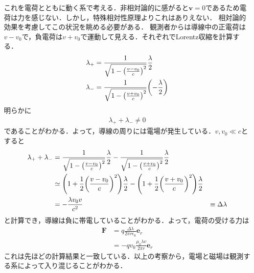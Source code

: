 \documentclass{report}
\begin{document}
  これを電荷とともに動く系で考える．非相対論的に感がると$\bm{v}=0$であるため電荷は力を感じない．しかし，特殊相対性原理よりこれはありえない．
  相対論的効果を考慮してこの状況を眺める必要がある．
  観測者からは導線中の正電荷は$v-v_0$で，負電荷は$v+v_0$で運動して見える．それぞれでLorentz収縮を計算する．
  \begin{align}
    \lambda_{+} &= \frac{1}{\sqrt{1-\qty(\frac{v-v_0}{c})^2}}\frac{\lambda}{2}\\
    \lambda_{-} &= \frac{1}{\sqrt{1-\qty(\frac{v+v_0}{c})^2}}\qty(-\frac{\lambda}{2})
  \end{align}
  明らかに
  \begin{align}
    \lambda_{+} + \lambda_{-} \neq 0
  \end{align}
  であることがわかる．よって，導線の周りには電場が発生している．$v,v_0 \ll c$とすると
  \begin{align}
    \lambda_{+} + \lambda_{-} &= \frac{1}{\sqrt{1-\qty(\frac{v-v_0}{c})^2}}\frac{\lambda}{2} - \frac{1}{\sqrt{1-\qty(\frac{v+v_0}{c})^2}}\frac{\lambda}{2}\\
    &\simeq \qty(1 + \frac{1}{2}\qty(\frac{v-v_0}{c})^2)\frac{\lambda}{2} - \qty(1 + \frac{1}{2}\qty(\frac{v+v_0}{c})^2)\frac{\lambda}{2}\\
    &= - \frac{\lambda v_0 v}{c^2}
    &\equiv \Delta \lambda
  \end{align}
  と計算でき，導線は負に帯電していることがわかる．よって，電荷の受ける力は
  \begin{align}
    \bm{F} &= q\frac{\Delta \lambda}{2\pi r \epsilon_0}\bm{e}_r\\
    &=-qv_0\frac{\mu_0 \lambda v}{2\pi r}\bm{e}_r
  \end{align}
  これは先ほどの計算結果と一致している．以上の考察から，電場と磁場は観測する系によって入り混じることがわかる．
\end{document}
